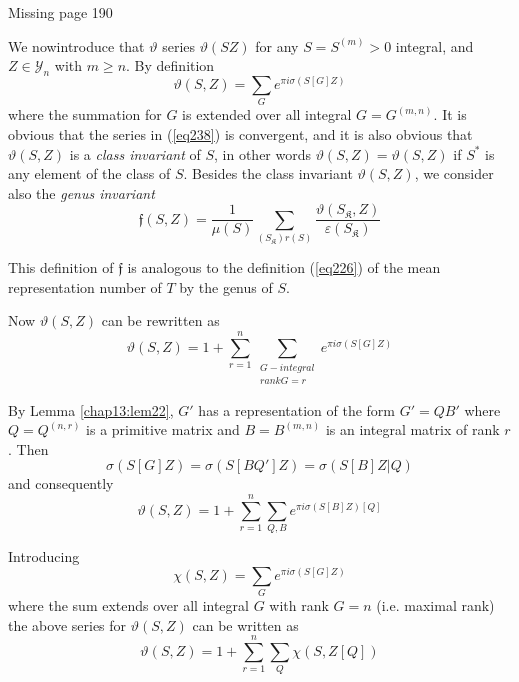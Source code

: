 \newpage

\pageoriginale

\vfill

\begin{center}
\Huge{Missing page 190}
\end{center}

\vfill

\newpage



We now\pageoriginale introduce that $\vartheta$ series $\vartheta (S
Z)$ for any $S = S^{(m)} > 0$ integral, and $Z \in \mathscr{Y}_n$ with
$m \ge n$. By definition  
\begin{equation*}
\vartheta (S,Z) = \sum_G e^{\pi i \sigma (S [G]Z)} \tag{238}\label{eq238} 
\end{equation*}
where the summation for $G$ is extended over all integral $G
=G^{(m,n)}$. It is obvious that the series in (\ref{eq238}) is convergent,
and it is also obvious that $\vartheta (S, Z)$ is a \textit{class
  invariant} of $S$, in other words $\vartheta (S, Z) = \vartheta (S,
Z)$ if $S^*$ is any element of the class of $S$. Besides the class
invariant $\vartheta (S, Z)$, we consider also the \textit{genus
  invariant} 
\begin{equation*}
\mathfrak{f} (S, Z) = \frac{1}{\mu (S)} \sum_{(S_\mathfrak{K}) r (S)}
\frac{\vartheta (S_\mathfrak{K}, Z)}{\varepsilon (S_\mathfrak{K})}
\tag{239}\label{eq239}   
\end{equation*}

This definition of $\mathfrak{f}$ is analogous to the definition
(\ref{eq226}) of the mean representation number of $T$ by the genus of $S$. 

Now $\vartheta (S, Z)$ can be rewritten as 
$$
\vartheta(S, Z) = 1 + \sum^n_{r = 1} \sum_{\substack {G - integral
    \\ rank G = r}}  e^{\pi i \sigma (S[G]Z)} 
$$

By Lemma \ref{chap13:lem22}, $G'$ has a representation of the form $G'
= Q B'$ where 
$Q= Q^{(n, r)}$ is a primitive matrix and $B = B^{(m ,n )}$ is an
integral matrix of rank $r$. Then 
$$
\sigma (S[G]Z) = \sigma (S[BQ']Z) = \sigma (S[B]Z|Q) 
$$
and consequently
$$
\vartheta (S, Z) = 1 + \sum^{n}_{r = 1} \sum_{Q, B} e^{\pi i \sigma (S[B]Z)[Q]}
$$

Introducing\pageoriginale
\begin{equation*}
\chi (S, Z) = \sum_G e^{\pi i \sigma (S[G]Z)} \tag{240}\label{eq240} 
\end{equation*}
where the sum extends over all integral $G$ with rank $G = n$
(i.e. maximal rank) the above series for $\vartheta (S, Z)$ can be
written as  
$$
\vartheta (S,Z) = 1 + \sum^n_{r =1} \sum_Q \chi (S, Z[Q]) 
$$

